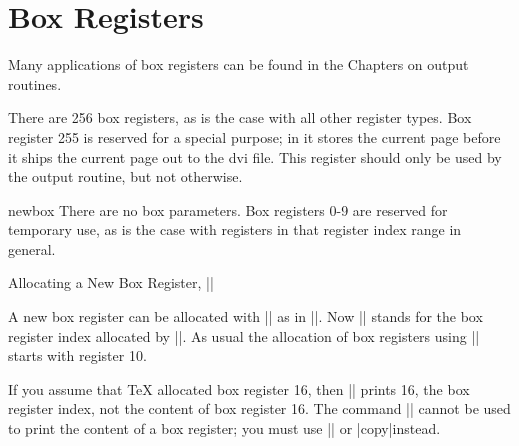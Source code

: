 \chapter{Box Registers}
 

Many applications of box registers can be found in the Chapters on output 
routines. 

There are 256 box registers, as is the case with all other register types. Box 
register 255 is reserved for a special purpose; in it \tex stores the current page 
before it ships the current page out to the dvi file. 
This register should only be used by the output routine, but not 
otherwise.
 
\begin{docCommand}{newbox}{}{}
There are no box parameters. Box registers 0-9 are reserved for temporary use, as is the case with registers 
in that register index range in general. 
\end{docCommand}

Allocating a New Box Register, |\newbox| 

A new box register can be allocated with |\newbox| as in |\newbox\abox|. Now 
|\abox| stands for the box register index allocated by |\newbox|. As usual the 
allocation of box registers using |\newbox| starts with register 10. 


If you assume that TeX allocated box register 16, then |\the\abox| prints 
16, the box register index, not the content of box register 16. The command 
|\the| cannot be used to print the content of a box register; you must use |\box| 
or |copy|instead.  

